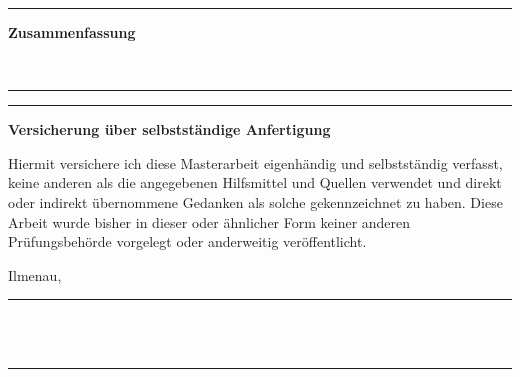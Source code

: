 \vfill
{\color{thillux-grey}\hrule}
\begin{center}
\color{thillux-blue}\large\sffamily\textbf{Zusammenfassung}
\end{center}
\blindtext\\[1em]
{\color{thillux-grey}\hrule}
\vfill

{\color{thillux-grey}\rule{\textwidth}{1pt}}
\begin{center}
	\color{thillux-blue}\large\sffamily\textbf{Versicherung über selbstständige Anfertigung}
\end{center}

Hiermit versichere ich diese Masterarbeit eigenhändig und selbstständig verfasst, keine anderen als die angegebenen Hilfsmittel und Quellen verwendet und direkt oder indirekt übernommene Gedanken als solche gekennzeichnet zu haben.
Diese Arbeit wurde bisher in dieser oder ähnlicher Form keiner anderen Prüfungsbehörde vorgelegt oder anderweitig veröffentlicht.
\vspace{3em}
\begin{center}
	Ilmenau, \eingereichtAm \hfill \rule{15em}{0.5pt}\\\hspace{\textwidth}\hspace{-15em} \NameDesAutors\\[1em]
	{\color{thillux-grey}\rule{\textwidth}{1pt}}
\end{center}
